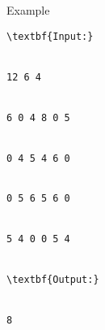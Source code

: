 Example
\begin{verbatim}
\textbf{Input:}


12 6 4


6 0 4 8 0 5


0 4 5 4 6 0


0 5 6 5 6 0


5 4 0 0 5 4


\textbf{Output:}


8


\end{verbatim}